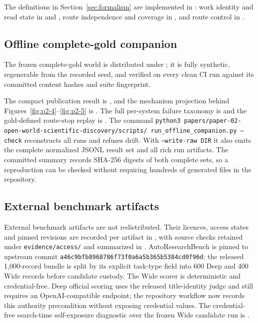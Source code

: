 The definitions in Section~\ref{sec:formalism} are implemented in
: work identity and read state in 
and , route independence and coverage in , and
route control in .

\subsection*{Offline complete-gold companion}

The frozen complete-gold world is distributed under
; it is fully synthetic, regenerable from the
recorded seed, and verified on every clean CI run against its committed content
hashes and suite fingerprint.

The compact publication result is
, and the mechanism
projection behind Figures~\ref{fig:p2-4}--\ref{fig:p2-5} is
.  The full per-system
failure taxonomy is 
and the gold-defined route-stop replay is
.  The command
\texttt{python3 papers/paper-02-open-world-scientific-discovery/scripts/
run\_offline\_companion.py --check} reconstructs all \OfflineRunRecordCount{} runs and refuses drift.
With \texttt{--write-raw DIR} it also emits the complete normalized JSONL result
set and all rich run artifacts.  The committed summary records SHA-256 digests
of both complete sets, so a reproduction can be checked without requiring
hundreds of generated files in the repository.

\subsection*{External benchmark artifacts}

External benchmark artifacts are not redistributed.  Their licences, access
states and pinned revisions are recorded per artifact in
, with source checks retained
under \texttt{evidence/access/} and summarized in
.  AutoResearchBench
is pinned to upstream commit
\texttt{a46c9bfb8968786f73f0a6a5b365b5384cd0f96d}; the released 1,000-record
bundle is split by its explicit task-type field into 600 Deep and 400 Wide
records before candidate custody.  The Wide scorer is deterministic and
credential-free.  Deep official scoring uses the released title-identity judge
and still requires an OpenAI-compatible endpoint; the repository workflow now
records this authority precondition without exposing credential values.  The
credential-free search-time self-exposure diagnostic over the frozen Wide
candidate run is
.

